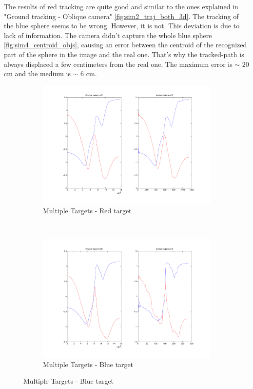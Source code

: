 	The results of red tracking are quite good and similar to the ones explained in "Ground tracking - Oblique camera" \ref{fig:sim2_traj_both_3d}. The tracking of the blue sphere seems to be wrong. However, it is not. This deviation is due to lack of information. The camera didn't capture the whole blue sphere \ref{fig:sim4_centroid_objs}, causing an error between the centroid of the recognized part of the sphere in the image and the real one. That's why the tracked-path is always displaced a few centimeters from the real one. The maximum error is $\sim$ 20 cm and the medium is $\sim$ 6 cm.

\begin{figure}[ht]
	\centering
	\begin{subfigure}[ht]{0.45\linewidth}
		\centering
		\includegraphics[width=\linewidth]{../Images/c3/sim4_redtarget}
		\caption{Multiple Targets - Red target}
		\label{fig:sim4_redtarget}	
	\end{subfigure}
	~
	\begin{subfigure}[ht]{0.45\linewidth}
		\centering
		\includegraphics[width=\linewidth]{../Images/c3/sim4_bluetarget}
		\caption{Multiple Targets - Blue target}
		\label{fig:sim4_bluetarget}
	\end{subfigure}
\end{figure}

